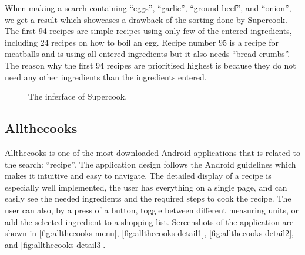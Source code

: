 When making a search containing ``eggs'', ``garlic'', ``ground beef'', and ``onion'', we get a result which showcases a drawback of the sorting done by Supercook. The first 94 recipes are simple recipes using only few of the entered ingredients, including 24 recipes on how to boil an egg. Recipe number 95 is a recipe for meatballs and is using all entered ingredients but it also needs ``bread crumbs''. The reason why the first 94 recipes are prioritised highest is because they do not need any other ingredients than the ingredients entered.
\begin{figure}[H]
\centering
{}
\caption{The inferface of Supercook.}
\label{fig:supercook}
\end{figure}

\subsection{Allthecooks}
Allthecooks is one of the most downloaded \cite{allthecooks-googleplay} Android applications that is related to the search: ``recipe''. The application design follows the Android guidelines\cite{guidelines-appstructure} which makes it intuitive and easy to navigate. The detailed display of a recipe is especially well implemented, the user has everything on a single page, and can easily see the needed ingredients and the required steps to cook the recipe. The user can also, by a press of a button, toggle between different measuring units, or add the selected ingredient to a shopping list. Screenshots of the application are shown in \autoref{fig:allthecooks-menu}, \ref{fig:allthecooks-detail1}, \ref{fig:allthecooks-detail2}, and \ref{fig:allthecooks-detail3}.

